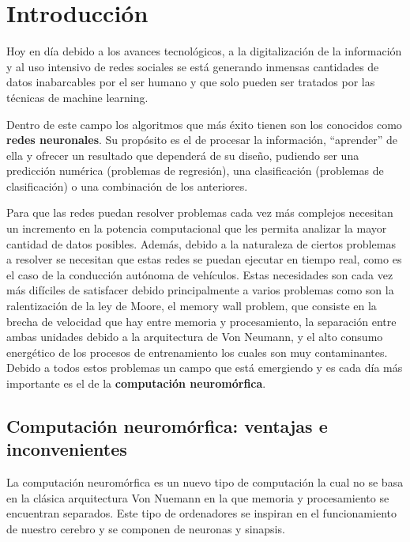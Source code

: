 \chapter{Introducción}
Hoy en día debido a los avances tecnológicos, a la digitalización de la información y al uso intensivo de redes sociales se está generando inmensas cantidades de datos inabarcables por el ser humano y que solo pueden ser tratados por las técnicas de machine learning.  

Dentro de este campo los algoritmos que más éxito tienen son los conocidos como \textbf{redes neuronales}. Su propósito es el de procesar la información, ``aprender'' de ella y ofrecer un resultado que dependerá de su diseño, pudiendo ser una predicción numérica (problemas de regresión), una clasificación (problemas de clasificación) o una combinación de los anteriores. 

Para que las redes puedan resolver problemas cada vez más complejos necesitan un incremento en la potencia computacional que les permita analizar la mayor cantidad de datos posibles. Además, debido a la naturaleza de ciertos problemas a resolver se necesitan que estas redes se puedan ejecutar en tiempo real, como es el caso de la conducción autónoma de vehículos. Estas necesidades son cada vez más difíciles de satisfacer debido principalmente a varios problemas como son la ralentización de la ley de Moore, el memory wall problem, que consiste en la brecha de velocidad que hay entre memoria y procesamiento, la separación entre ambas unidades debido a la arquitectura de Von Neumann, y el alto consumo energético de los procesos de entrenamiento los cuales son muy contaminantes. Debido a todos estos problemas un campo que está emergiendo y es cada día más importante es el de la \textbf{computación neuromórfica}. 

\section{Computación neuromórfica: ventajas e inconvenientes}
La computación neuromórfica es un nuevo tipo de computación la cual no se basa en la clásica arquitectura Von Nuemann en la que memoria y procesamiento se encuentran separados. Este tipo de ordenadores se inspiran en el funcionamiento de nuestro cerebro y se componen de neuronas y sinapsis. 

